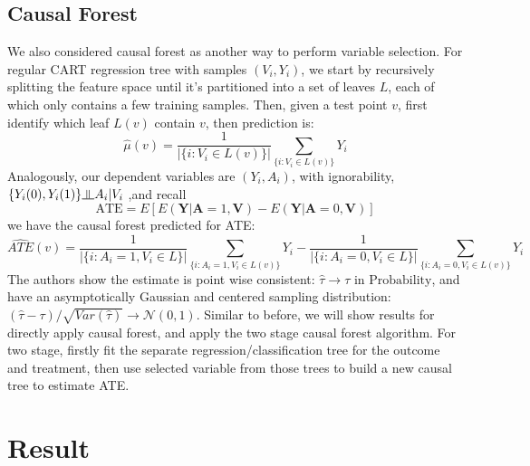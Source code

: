 \documentclass[11pt, oneside]{article}
\newcommand{\bA}{\mathbf{A}}
\newcommand{\bY}{\mathbf{Y}}
\newcommand{\bV}{\mathbf{V}}
\newcommand{\indep}{\rotatebox[origin=c]{90}{$\models$}}
\begin{document}
\subsection{Causal Forest}
We also considered causal forest \cite{Athey2019} as another way to perform variable selection. For regular CART regression tree with samples $(V_i,Y_i)$, we start by recursively splitting the feature space until it's partitioned into a set of leaves $L$, each of which only contains a few training samples. Then, given a test point $v$, first identify which leaf $L(v)$ contain $v$, then prediction is: 
$$\hat{\mu}(v)=\frac{1}{|\{i:V_i \in L(v)\}|}\sum_{\{i:V_i \in L(v)\}}Y_i$$
Analogously, our dependent variables are $(Y_i,A_i)$, with ignorability, $\{Y_i(0),Y_i(1)\} \indep A_i | V_i$ ,and recall
$$\mbox{ATE}=E[E(\bY | \bA = 1, \bV) - E(\bY | \bA = 0, \bV)]$$
we have the causal forest predicted for ATE:
$$
\hat{ATE}(v) = \frac{1}{|\{i:A_i=1, V_i \in L\}|}\sum_{\{i:A_i=1, V_i \in L(v)\}} Y_i - \frac{1}{|\{i:A_i=0, V_i \in L\}|}\sum_{\{i:A_i=0, V_i \in L(v)\}} Y_i
$$
The authors show the estimate is point wise consistent: $\hat{\tau} \rightarrow \tau \mbox{ in Probability}$, and have an asymptotically Gaussian and centered sampling distribution: $(\hat{\tau}-\tau)/\sqrt{Var(\hat{\tau})} \rightarrow \mathcal{N}(0,1)$. Similar to before, we will show results for directly apply causal forest, and apply the two stage causal forest algorithm. For two stage, firstly fit the separate regression/classification tree for the outcome and treatment, then use selected variable from those trees to build a new causal tree to estimate ATE.
\section{Result}\label{sec:result}
\end{document}
